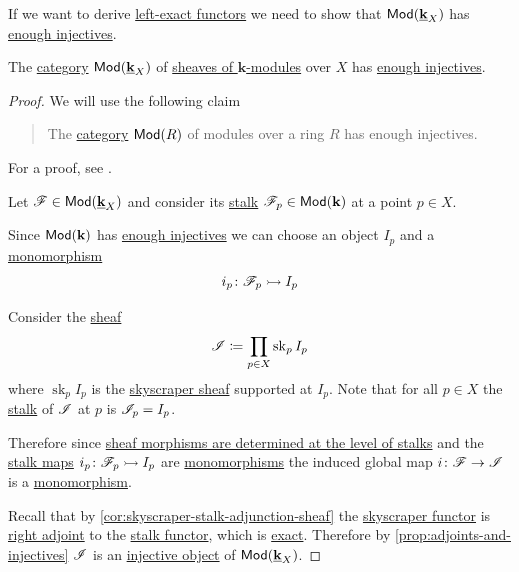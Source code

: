 \documentclass[../../main]{subfiles}
\begin{document}
If we want to derive \hyperref[def:exact-functor]{left-exact functors} we need to show that \(\mathsf{Mod}(\underline{\mathbf{k}}_{X})\) has \hyperref[def:enough-injectives-projectives]{enough injectives}.
\begin{lemma}\label{lemma:mod-ox-has-enough-injectives}
  The \hyperref[def:category]{category} \(\mathsf{Mod}(\underline{\mathbf{k}}_{X})\) of \hyperref[def:sheaf]{sheaves of \(\mathbf{k}\)-modules} over \(X\) has \hyperref[def:enough-injectives-projectives]{enough injectives}.
\end{lemma}
\begin{proof}
  We will use the following claim
  \begin{quote}
    The \hyperref[def:category]{category} \(\mathsf{Mod}(R)\) of modules over a ring \(R\) has enough injectives.
  \end{quote}
  For a proof, see \cite[Corollary VIII.6.4]{aluffiAlgebraChapter02009}.
  
  Let \(\mathscr{F} \in \mathsf{Mod}(\underline{\mathbf{k}}_{X})\) and consider its \hyperref[def:stalk]{stalk} \(\mathscr{F}_{p} \in \mathsf{Mod}(\mathbf{k})\) at a point \(p \in X\).

  Since \(\mathsf{Mod}(\mathbf{k})\) has \hyperref[def:enough-injectives-projectives]{enough injectives} we can choose an object \(I_{p}\) and a \hyperref[def:mono-epi-morphism]{monomorphism}
  \begin{equation*}
    i_{p}\colon \mathscr{F}_{p} \rightarrowtail I_{p}
  \end{equation*}

  Consider the \hyperref[def:sheaf]{sheaf}
  \begin{equation*}
    \mathscr{I} \coloneq \prod_{p \in X} \operatorname{sk}_{p} I_{p}
  \end{equation*}
  where \(\operatorname{sk}_{p}I_{p}\) is the \hyperref[def:skyscraper-sheaf]{skyscraper sheaf} supported at \(I_{p}\).
  Note that for all \(p \in X\) the \hyperref[def:stalk]{stalk} of \(\mathscr{I}\) at \(p\) is \(\mathscr{I}_{p} = I_{p}\).
  
  Therefore since \hyperref[prop:sheaf-isomorphism-determined-at-stalks]{sheaf morphisms are determined at the level of stalks} and the \hyperref[def:stalk]{stalk maps} \(i_{p}\colon \mathscr{F}_{p} \rightarrowtail I_{p}\) are \hyperref[def:mono-epi-morphism]{monomorphisms} the induced global map \(i\colon \mathscr{F} \to \mathscr{I}\) is a \hyperref[def:mono-epi-morphism]{monomorphism}.

  Recall that by \autoref{cor:skyscraper-stalk-adjunction-sheaf} the \hyperref[def:skyscraper-sheaf]{skyscraper functor} is \hyperref[def:adjoint-functors]{right adjoint} to the \hyperref[def:stalk]{stalk functor}, which is \hyperref[def:exact-functor]{exact}.
  Therefore by \autoref{prop:adjoints-and-injectives} \(\mathscr{I}\) is an \hyperref[def:injective-projective-object]{injective object} of \(\mathsf{Mod}(\underline{\mathbf{k}}_{X})\).
\end{proof}
\end{document}
